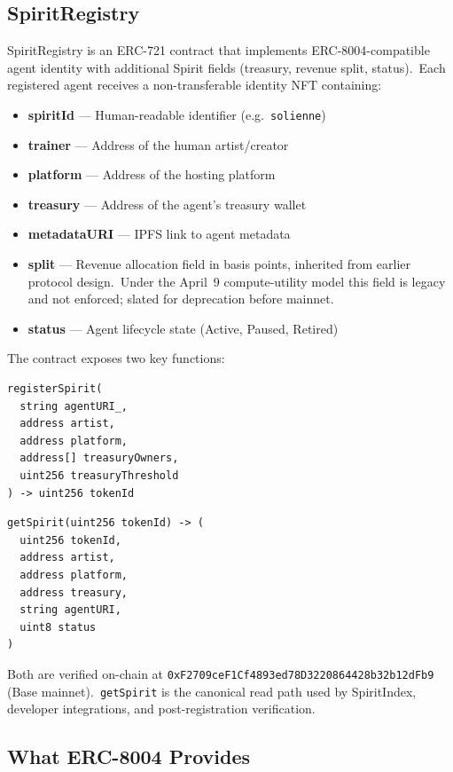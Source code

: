 \documentclass[12pt]{article}
\newcommand{\code}[1]{\texttt{#1}}
\begin{document}
\subsection{SpiritRegistry}

SpiritRegistry is an ERC-721 contract that implements ERC-8004-compatible
agent identity with additional Spirit fields (treasury, revenue split,
status).\ Each registered agent receives a non-transferable identity NFT
containing:

\begin{itemize}[nosep]
    \item \textbf{spiritId} --- Human-readable identifier
          (e.g.\ \code{solienne})
    \item \textbf{trainer} --- Address of the human artist/creator
    \item \textbf{platform} --- Address of the hosting platform
    \item \textbf{treasury} --- Address of the agent's treasury wallet
    \item \textbf{metadataURI} --- IPFS link to agent metadata
    \item \textbf{split} --- Revenue allocation field in basis points,
          inherited from earlier protocol design.\ Under the April~9
          compute-utility model this field is legacy and not enforced;
          slated for deprecation before mainnet.
    \item \textbf{status} --- Agent lifecycle state
          (Active, Paused, Retired)
\end{itemize}

The contract exposes two key functions:

\begin{lstlisting}
registerSpirit(
  string agentURI_,
  address artist,
  address platform,
  address[] treasuryOwners,
  uint256 treasuryThreshold
) -> uint256 tokenId
\end{lstlisting}

\begin{lstlisting}
getSpirit(uint256 tokenId) -> (
  uint256 tokenId,
  address artist,
  address platform,
  address treasury,
  string agentURI,
  uint8 status
)
\end{lstlisting}

Both are verified on-chain at
\code{0xF2709ceF1Cf4893ed78D3220864428b32b12dFb9} (Base mainnet).\
\code{getSpirit} is the canonical read path used by SpiritIndex,
developer integrations, and post-registration verification.


\subsection{What ERC-8004 Provides}
\end{document}
